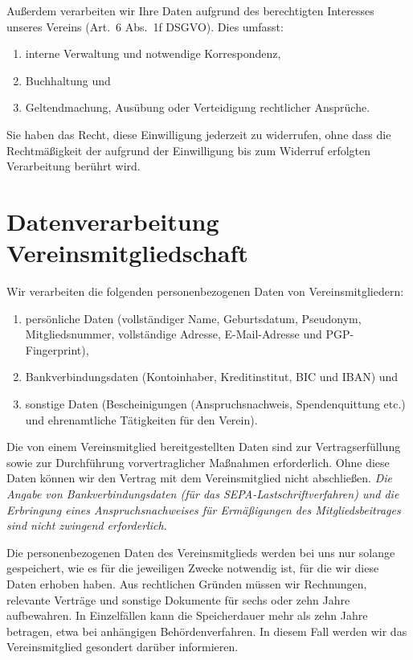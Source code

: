 \documentclass[a4paper, 10pt, headings=normal]{scrartcl}
\begin{document}
\begin{multicols*}{2}
Außerdem verarbeiten wir Ihre Daten aufgrund des berechtigten Interesses unseres Vereins (Art.~6 Abs.~1f DSGVO). Dies umfasst:

\begin{enumerate}[label={\arabic*.}]
	\item
		interne Verwaltung und notwendige Korrespondenz,
	\item
		Buchhaltung und
	\item
		Geltendmachung, Ausübung oder Verteidigung rechtlicher Ansprüche.
\end{enumerate}

Sie haben das Recht, diese Einwilligung jederzeit zu widerrufen, ohne dass die Rechtmäßigkeit der aufgrund der Einwilligung bis zum Widerruf erfolgten Verarbeitung berührt wird.

\section{Datenverarbeitung Vereinsmitgliedschaft}

Wir verarbeiten die folgenden personenbezogenen Daten von Vereinsmitgliedern:

\begin{enumerate}[label={\arabic*.}]
	\item
		persönliche Daten (vollständiger Name, Geburtsdatum, Pseudonym, Mitgliedsnummer, vollständige Adresse, E-Mail-Adresse und PGP-Fingerprint),
	\item
		Bankverbindungsdaten (Kontoinhaber, Kreditinstitut, BIC und IBAN) und
	\item
		sonstige Daten (Bescheinigungen (Anspruchsnachweis, Spendenquittung etc.) und ehrenamtliche Tätigkeiten für den Verein).
\end{enumerate}

Die von einem Vereinsmitglied bereitgestellten Daten sind zur Vertragserfüllung sowie zur Durchführung vorvertraglicher Maßnahmen erforderlich.
Ohne diese Daten können wir den Vertrag mit dem Vereinsmitglied nicht abschließen.
\emph{Die Angabe von Bankverbindungsdaten (für das SEPA-Lastschriftverfahren) und die Erbringung eines Anspruchsnachweises für Ermäßigungen des Mitgliedsbeitrages sind nicht zwingend erforderlich.}

Die personenbezogenen Daten des Vereinsmitglieds werden bei uns nur solange gespeichert, wie es für die jeweiligen Zwecke notwendig ist, für die wir diese Daten erhoben haben.
Aus rechtlichen Gründen müssen wir Rechnungen, relevante Verträge und sonstige Dokumente für sechs oder zehn Jahre aufbewahren.
In Einzelfällen kann die Speicherdauer mehr als zehn Jahre betragen, etwa bei anhängigen Behördenverfahren.
In diesem Fall werden wir das Vereinsmitglied gesondert darüber informieren.


\end{multicols*}
\end{document}
